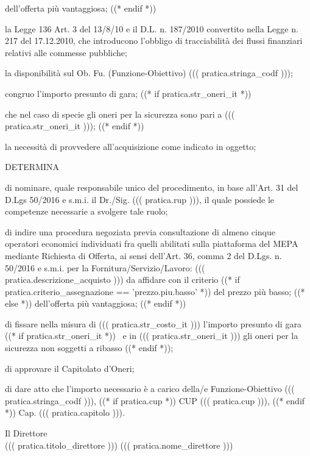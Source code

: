 \documentclass[a4paper,12pt]{letter}
\begin{document}
\begin{list}{VALUTATA}{}
dell'offerta più vantaggiosa;
   ((* endif *))
\item[VISTA] la Legge 136 Art. 3 del 13/8/10 e il D.L. n. 187/2010 convertito nella Legge 
        n. 217 del 17.12.2010, che introducono l'obbligo di tracciabilità dei flussi 
        finanziari relativi alle commesse pubbliche; 
\item[VISTA] la disponibilità sul Ob. Fu. (Funzione-Obiettivo) ((( pratica.stringa_codf ))); 
\item[VALUTATO] congruo l'importo presunto di gara;
((* if pratica.str_oneri_it *))
\item[RILEVATO] che nel caso di specie gli oneri per la sicurezza sono pari a ((( pratica.str_oneri_it )));
((* endif *))
\item[VALUTATA] la necessità di provvedere all'acquisizione come indicato in oggetto;
\end{list}



\begin{center}
DETERMINA
\end{center}

\begin{list}{VALUTATA}{}
\item[Art.~1:] di nominare, quale responsabile unico del procedimento, in base 
           all'Art. 31 del D.Lgs 50/2016 e s.m.i. il Dr./Sig. ((( pratica.rup ))),
           il quale possiede le competenze necessarie a svolgere tale ruolo; 
\item[Art.~2:] di indire una procedura negoziata previa consultazione di almeno cinque operatori
           economici individuati fra quelli abilitati
	   sulla piattaforma del MEPA mediante
           Richiesta di Offerta, ai sensi dell'Art. 36, comma 2 del D.Lgs. n. 50/2016 e s.m.i.
           per la Fornitura/Servizio/Lavoro: ((( pratica.descrizione_acquisto ))) da affidare con
           il criterio %
   ((* if pratica.criterio_assegnazione == 'prezzo.piu.basso' *)) %
del prezzo più basso;
   ((* else *)) %
dell'offerta più vantaggiosa;
   ((* endif *))

\item[Art.~3:] di fissare nella misura di ((( pratica.str_costo_it ))) l'importo presunto di gara%
((* if pratica.str_oneri_it *))%
  ~e in ((( pratica.str_oneri_it ))) gli oneri per la sicurezza non soggetti a ribasso%
((* endif *));

\item[Art.~4:] di approvare il Capitolato d'Oneri;

\item[Art.~5:] di dare atto che l'importo necessario è a carico della/e Funzione-Obiettivo ((( pratica.stringa_codf ))), ((* if pratica.cup *)) CUP ((( pratica.cup ))), ((* endif *)) Cap. ((( pratica.capitolo ))).
\end{list}

\vspace{0.5cm}

\begin{flushright}
\begin{minipage}[t]{6cm}
\begin{center}
Il Direttore \\
((( pratica.titolo_direttore ))) ((( pratica.nome_direttore )))
\end{center}
\end{minipage}
\end{flushright}
\end{document}
